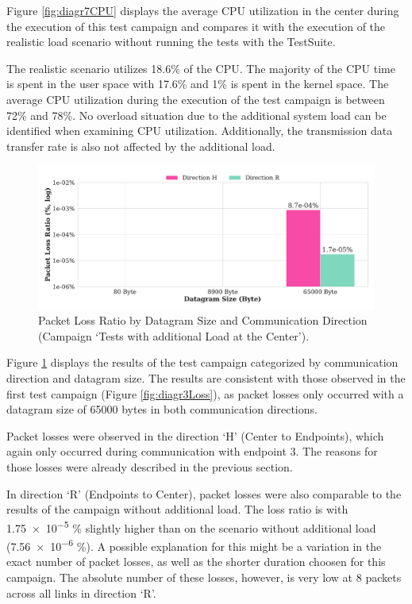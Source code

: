 Figure \ref{fig:diagr7CPU} displays the average \ac{CPU} utilization in the center during the execution of this test campaign and compares it with the execution of the realistic load scenario without running the tests with the TestSuite.

The realistic scenario utilizes 18.6\% of the \ac{CPU}. The majority of the \ac{CPU} time is spent in the user space with 17.6\% and 1\% is spent in the kernel space. The average \ac{CPU} utilization during the execution of the test campaign is between 72\% and 78\%. No overload situation due to the additional system load can be identified when examining \ac{CPU} utilization. Additionally, the transmission data transfer rate is also not affected by the additional load.

\begin{figure}[h]
    \centering
    \includegraphics[width=1\linewidth]{figures/reliability/ihawk/diagr8.pdf}
    \caption{Packet Loss Ratio by Datagram Size and Communication Direction (Campaign `Tests with additional Load at the Center').}
    \label{fig:diagr8Loss}
\end{figure}

Figure \ref{fig:diagr8Loss} displays the results of the test campaign categorized by communication direction and datagram size. The results are consistent with those observed in the first test campaign (Figure \ref{fig:diagr3Loss}), as packet losses only occurred with a datagram size of 65000 bytes in both communication directions.

Packet losses were observed in the direction `H' (Center to Endpoints), which again only occurred during communication with endpoint 3. The reasons for those losses were already described in the previous section.

In direction `R' (Endpoints to Center), packet losses were also comparable to the results of the campaign without additional load. The loss ratio is with \num{1.75e-5} \% slightly higher than on the scenario without additional load (\num{7.56e-6} \%). A possible explanation for this might be a variation in the exact number of packet losses, as well as the shorter duration choosen for this campaign. The absolute number of these losses, however, is very low at 8 packets across all links in direction `R'.


